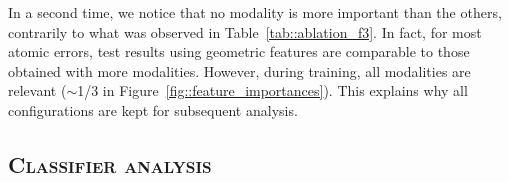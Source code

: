             In a second time, we notice that no modality is more important than the others, contrarily to what was observed in Table~\ref{tab::ablation_f3}.
            In fact, for most atomic errors, test results using geometric features are comparable to those obtained with more modalities.
            However, during training, all modalities are relevant ($\sim$1/3 in Figure~\ref{fig::feature_importances}).
            This explains why all configurations are kept for subsequent analysis.

    \subsection{\textsc{Classifier analysis}}
